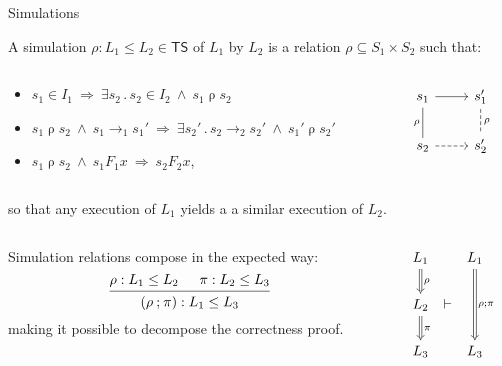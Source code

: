 \documentclass[aspectratio=1610,12pt]{beamer}
\begin{document}
\begin{frame}[fragile]{Simulations} %

  A simulation $\rho : L_1 \le L_2 \in \mathsf{TS}$ of $L_1$ by $L_2$
  is a relation $\rho \subseteq S_1 \times S_2$ such that:
  \vspace{-1ex}
  \begin{columns}
    \begin{column}{.68\textwidth}
      \begin{itemize}
        \item $s_1 \in I_1 \:\Rightarrow\: \exists s_2 \mathbin.
          s_2 \in I_2 \:\wedge\: s_1 \mathrel{\rho} s_2$
        \item $s_1 \mathrel{\rho} s_2 \:\wedge\: s_1 \rightarrow_1 s_1'
          \:\Rightarrow\: \exists s_2' \mathbin.
            s_2 \rightarrow_2 s_2' \:\wedge\: s_1' \mathrel{\rho} s_2'$
        \item $s_1 \mathrel{\rho} s_2 \:\wedge\: s_1 \mathrel{F_1} x
          \:\Rightarrow\: s_2 \mathrel{F_2} x$,
      \end{itemize}
    \end{column}
    \begin{column}{.25\textwidth}
      \[
      \begin{tikzcd}
        s_1 \ar[d,"\rho"',dash] \ar[r] & s_1' \ar[d,dashed,dash,"\rho"] \\
        s_2 \ar[r,dashed] & s_2'
      \end{tikzcd}
      \]
    \end{column}
  \end{columns}
  \vspace{1ex}
  so that any execution of $L_1$ yields a
  a similar execution of $L_2$.

  \pause
  \begin{columns}
    \begin{column}{.68\textwidth}
  Simulation relations compose in the expected way:
  \[
    \begin{prooftree}
      \hypo{\rho : L_1 \le L_2}
      \hypo{\pi : L_2 \le L_3}
      \infer2{(\rho \mathbin; \pi) : L_1 \le L_3}
    \end{prooftree}
  \]
  making it possible to decompose the correctness proof.
    \end{column}
    \pause
    \begin{column}{.25\textwidth}
      \[
        \begin{tikzcd}[column sep=0.5ex]
          L_1 \ar[d, Rightarrow, "\rho"] &&
          L_1 \ar[dd, Rightarrow, "\rho \mathbin; \pi"] \\
          L_2 \ar[d, Rightarrow, "\pi"] & \vdash \\
          L_3 && L_3
        \end{tikzcd}
      \]
    \end{column}
  \end{columns}
\end{frame}
\end{document}
